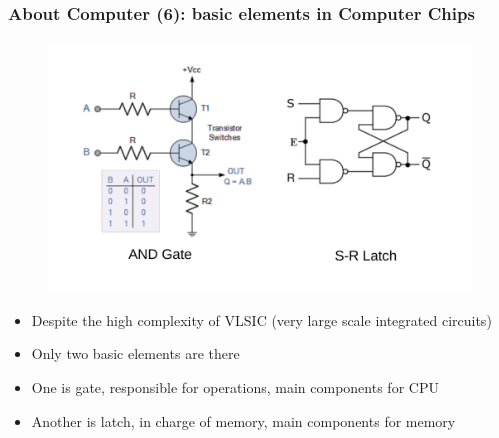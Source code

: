 \begin{frame}
\frametitle{About Computer (6): basic elements in Computer Chips}
\begin{figure}
	\includegraphics[width=0.6\linewidth]{figs/chips.pdf}
\end{figure}
\begin{itemize}
	\item {Despite the high complexity of VLSIC (very large scale integrated circuits)}
	\item {Only two basic elements are there}
	\item {One is gate, responsible for operations, main components for CPU}
	\item {Another is latch, in charge of memory, main components for memory}
\end{itemize}
\end{frame}